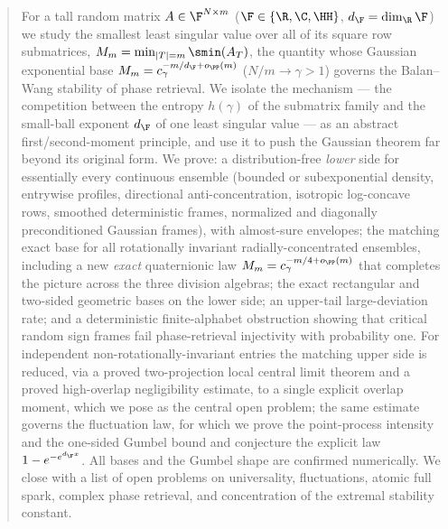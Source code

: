 
\begin{abstract}
For a tall random matrix $A\in\F^{N\times m}$ ($\F\in\{\R,\C,\HH\}$, $d_\F=\dim_\R\F$) we study the
smallest least singular value over all of its square row submatrices,
$M_m=\min_{|T|=m}\smin(A_T)$, the quantity whose Gaussian exponential base
$M_m=c_\gamma^{-m/d_\F+o_\PP(m)}$ ($N/m\to\gamma>1$) governs the Balan--Wang stability of phase
retrieval.  We isolate the mechanism --- the competition between the entropy $h(\gamma)$ of the
submatrix family and the small-ball exponent $d_\F$ of one least singular value --- as an abstract
first/second-moment principle, and use it to push the Gaussian theorem far beyond its original
form.  We prove: a distribution-free \emph{lower} side for essentially every continuous ensemble
(bounded or subexponential density, entrywise profiles, directional anti-concentration, isotropic
log-concave rows, smoothed deterministic frames, normalized and diagonally preconditioned Gaussian
frames), with almost-sure envelopes; the matching exact base for all rotationally invariant
radially-concentrated ensembles, including a new \emph{exact} quaternionic law $M_m=c_\gamma^{-m/4+o_\PP(m)}$
that completes the picture across the three division algebras; the exact rectangular and
two-sided geometric bases on the lower side; an upper-tail large-deviation rate; and a deterministic
finite-alphabet obstruction showing that critical random sign frames fail phase-retrieval injectivity
with probability one.  For independent non-rotationally-invariant entries the matching upper side
is reduced, via a proved two-projection local central limit theorem and a proved high-overlap
negligibility estimate, to a single explicit overlap moment, which we pose as the central open
problem; the same estimate governs the fluctuation law, for which we prove the point-process
intensity and the one-sided Gumbel bound and conjecture the explicit law $1-e^{-e^{d_\F x}}$.
All bases and the Gumbel shape are confirmed numerically.  We close with a list of open problems on
universality, fluctuations, atomic full spark, complex phase retrieval, and concentration of the
extremal stability constant.
\end{abstract}

